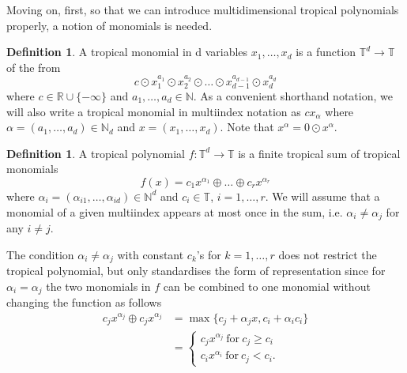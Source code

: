 \documentclass{article}
\theoremstyle{definition}
\newtheorem{definition}[theorem]{Definition}
\begin{document}
Moving on, first, so that we can introduce multidimensional tropical polynomials properly, a notion of monomials is needed.

\begin{definition}
\cite[p.~2]{zhang2018tropical}
A tropical monomial in d variables $x_1 , \dots , x_d$ is a function $ \mathbb{T}^{d} \to \mathbb{T} $ of the from 
$$ c \odot x_1^{a_1} \odot x_2^{a_2} \odot \dots \odot x_{d-1}^{a_{d-1}} \odot x_d^{a_d}$$
where $c \in \mathbb{R} \cup \{- \infty \}$ and $a_1, \dots , a_d \in \mathbb{N}$. As a convenient shorthand notation, we will also write a tropical monomial in multiindex notation as $cx_{\alpha}$ where $\alpha = (a_1 , \dots , a_d) \in \mathbb{N}_d$ and $x = (x_1 , \dots , x_d)$. Note that $x^{\alpha} = 0 \odot x^{\alpha}$.
\end{definition}

\begin{definition}\label{tropPolyn}
\cite[p.~2]{zhang2018tropical}
A tropical polynomial $f: \mathbb{T}^{d} \to \mathbb{T}$ is a finite tropical sum of tropical monomials 
$$ f(x)=c_1x^{\alpha_1} \oplus \dots \oplus c_rx^{\alpha_r}$$
where $\alpha_i = (\alpha_{i1}, \dots , \alpha_{id}) \in \mathbb{N}^{d}$ and $c_i \in \mathbb{T}$, $i = 1, \dots , r$. We will assume that a monomial of a given multiindex appears at most once in the sum, i.e. $\alpha_i \neq \alpha_j$ for any $i \neq j$.
\end{definition}

The condition $\alpha_i \neq \alpha_j$ with constant $c_{k}$'s for $k=1, \dots , r$ does not restrict the tropical polynomial, but only standardises the form of representation since for $\alpha_{i} = \alpha_{j}$ the two monomials in $f$ can be combined to one monomial without changing the function as follows 
\begin{align*}
c_jx^{\alpha_j} \oplus c_jx^{\alpha_j} 
&= \max \{ c_{j} + \alpha_{j} x , c_{i} + \alpha_{i} c_{i} \} \\
&= \begin{cases} c_{j} x^{\alpha_{j}} \ \text{for} \ c_{j} \geq c_{i}\\
c_{i} x^{\alpha_{i}} \ \text{for} \ c_{j} < c_{i}.
\end{cases}
\end{align*}
\end{document}
